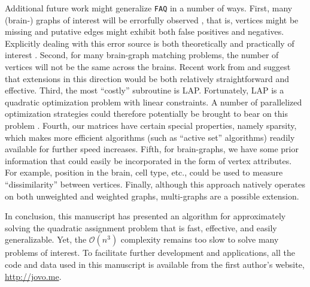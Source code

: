 \documentclass[11pt]{article}
\providecommand{\norm}[1]{\left \lVert#1 \right  \rVert}
\newcommand{\argmin}{\operatornamewithlimits{argmin}}
\newcommand{\T}{^{\ensuremath{\mathsf{T}}}}           %
\providecommand{\mc}[1]{\mathcal{#1}}
\providecommand{\mt}[1]{\widetilde{#1}}
\newcommand{\FAQ}{\texttt{FAQ} }
\begin{document}
Additional future work might generalize \FAQ in a number of ways.  First, many (brain-) graphs of interest will be errorfully observed \cite{Priebe2011}, that is, vertices might be missing and putative edges might exhibit both false positives and negatives.  Explicitly dealing with this error source is both theoretically and practically of interest \cite{VP11_unlabeled}.  
Second, for many brain-graph matching problems, the number of vertices will not be the same across the brains.  Recent work from \cite{Zaslavskiy2009, Zaslavskiy2010} and \cite{Escolano2011} suggest that extensions in this direction would be both relatively straightforward and effective. Third, the most ``costly'' subroutine is LAP.  Fortunately, LAP is a quadratic optimization problem with linear constraints.  A number of parallelized optimization strategies could therefore potentially be brought to bear on this problem \cite{Boyd2011}.  Fourth, our matrices have certain special properties, namely sparsity, which makes more efficient algorithms (such as ``active set'' algorithms) readily available for further speed increases.  Fifth, for brain-graphs, we have some prior information that could easily be incorporated in the form of vertex attributes.  For example, position in the brain, cell type, etc., could be used to measure ``dissimilarity'' between vertices.  %
Finally, although this approach natively operates on both unweighted and weighted graphs, multi-graphs are a possible extension.

In conclusion, this manuscript has presented an algorithm for approximately solving the quadratic assignment problem that is fast, effective, and easily generalizable.  Yet, the $\mc{O}(n^3)$ complexity remains too slow to solve many problems of interest.  To facilitate further development and applications, all the code and data used in this manuscript is available from the first author's website, \url{http://jovo.me}.
\end{document}
